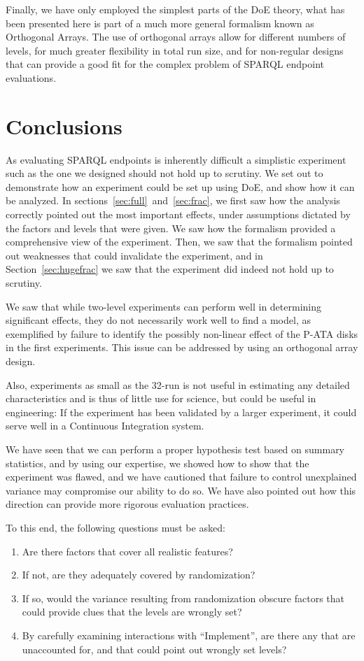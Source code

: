 \documentclass{llncs}
\begin{document}
Finally, we have only employed the simplest parts of the DoE theory,
what has been presented here is part of a much more general formalism
known as Orthogonal Arrays. The use of orthogonal arrays allow for
different numbers of levels, for much greater flexibility in total run
size, and for non-regular designs that can provide a good fit for the
complex problem of SPARQL endpoint evaluations.

\section{Conclusions}

As evaluating SPARQL endpoints is inherently difficult a simplistic
experiment such as the one we designed should not hold up to
scrutiny. We set out to demonstrate how an experiment could be set up
using DoE, and show how it can be analyzed. In
sections~\ref{sec:full}~and~\ref{sec:frac}, we first saw how the
analysis correctly pointed out the most important effects, under
assumptions dictated by the factors and levels that were given. We saw
how the formalism provided a comprehensive view of the
experiment. Then, we saw that the formalism pointed out weaknesses
that could invalidate the experiment, and in
Section~\ref{sec:hugefrac} we saw that the experiment did indeed not
hold up to scrutiny.

We saw that while two-level experiments can perform well in determining
significant effects, they do not necessarily work well to find a
model, as exemplified by failure to identify the possibly non-linear
effect of the P-ATA disks in the first experiments. This issue can be
addressed by using an orthogonal array design.

Also, experiments as small as the 32-run is not useful in estimating
any detailed characteristics and is thus of little use for science,
but could be useful in engineering: If the experiment has been
validated by a larger experiment, it could serve well in a Continuous
Integration system.

We have seen that we can perform a proper hypothesis test based on
summary statistics, and by using our expertise, we showed how to show
that the experiment was flawed, and we have cautioned that failure to
control unexplained variance may compromise our ability to do so. We
have also pointed out how this direction can provide more rigorous
evaluation practices.

To this end, the following questions must be asked:
\begin{enumerate}
\item Are there factors that cover all realistic features?
\item If not, are they adequately covered by randomization?
\item If so, would the variance resulting from randomization obscure
  factors that could provide clues that the levels are wrongly set?
\item By carefully examining interactions with ``Implement'', are
  there any that are unaccounted for, and that could point out wrongly
  set levels?
\end{enumerate}
\end{document}
